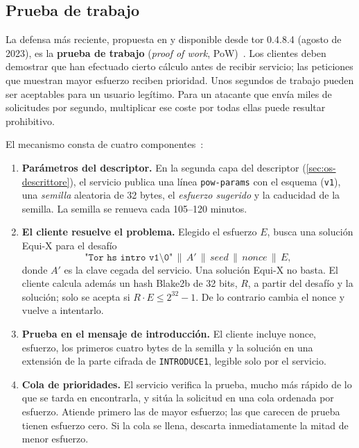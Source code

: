 \subsection{Prueba de trabajo}

La defensa más reciente, propuesta en  y disponible desde tor 0.4.8.4 (agosto de 2023), es la \textbf{prueba de trabajo} (\emph{proof of work}, PoW)~. Los clientes deben demostrar que han efectuado cierto cálculo antes de recibir servicio; las peticiones que muestran mayor esfuerzo reciben prioridad. Unos segundos de trabajo pueden ser aceptables para un usuario legítimo. Para un atacante que envía miles de solicitudes por segundo, multiplicar ese coste por todas ellas puede resultar prohibitivo.

El mecanismo consta de cuatro componentes~:
\begin{enumerate}
  \item \textbf{Parámetros del descriptor.} En la segunda capa del descriptor (\cref{sec:os-descrittore}), el servicio publica una línea \texttt{pow-params} con el esquema (\texttt{v1}), una \emph{semilla} aleatoria de 32 bytes, el \emph{esfuerzo sugerido} y la caducidad de la semilla. La semilla se renueva cada 105--120 minutos.
  \item \textbf{El cliente resuelve el problema.} Elegido el esfuerzo $E$, busca una solución Equi-X para el desafío
  \[ \texttt{"Tor hs intro v1\textbackslash 0"} \,\|\, A' \,\|\, \mathit{seed} \,\|\, \mathit{nonce} \,\|\, E, \]
  donde $A'$ es la clave cegada del servicio. Una solución Equi-X no basta. El cliente calcula además un hash Blake2b de 32 bits, $R$, a partir del desafío y la solución; solo se acepta si $R\cdot E \le 2^{32}-1$. De lo contrario cambia el nonce y vuelve a intentarlo.
  \item \textbf{Prueba en el mensaje de introducción.} El cliente incluye nonce, esfuerzo, los primeros cuatro bytes de la semilla y la solución en una extensión de la parte cifrada de \texttt{INTRODUCE1}, legible solo por el servicio.
  \item \textbf{Cola de prioridades.} El servicio verifica la prueba, mucho más rápido de lo que se tarda en encontrarla, y sitúa la solicitud en una cola ordenada por esfuerzo. Atiende primero las de mayor esfuerzo; las que carecen de prueba tienen esfuerzo cero. Si la cola se llena, descarta inmediatamente la mitad de menor esfuerzo.
\end{enumerate}

